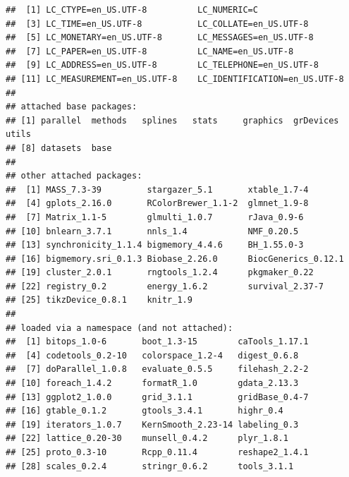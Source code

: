 \documentclass{article}\usepackage[]{graphicx}\usepackage[]{color}
\makeatletter
\newenvironment{kframe}{%
 \def\at@end@of@kframe{}%
 \ifinner\ifhmode%
  \def\at@end@of@kframe{\end{minipage}}%
  \begin{minipage}{\columnwidth}%
 \fi\fi%
 \def\FrameCommand##1{\hskip\@totalleftmargin \hskip-\fboxsep
 \colorbox{shadecolor}{##1}\hskip-\fboxsep
     \hskip-\linewidth \hskip-\@totalleftmargin \hskip\columnwidth}%
 \MakeFramed {\advance\hsize-\width
   \@totalleftmargin\z@ \linewidth\hsize
   \@setminipage}}%
 {\par\unskip\endMakeFramed%
 \at@end@of@kframe}
\newenvironment{knitrout}{}{} %
\makeatother
\begin{document}
\begin{knitrout}
\begin{kframe}
\begin{verbatim}
##  [1] LC_CTYPE=en_US.UTF-8          LC_NUMERIC=C                 
##  [3] LC_TIME=en_US.UTF-8           LC_COLLATE=en_US.UTF-8       
##  [5] LC_MONETARY=en_US.UTF-8       LC_MESSAGES=en_US.UTF-8      
##  [7] LC_PAPER=en_US.UTF-8          LC_NAME=en_US.UTF-8          
##  [9] LC_ADDRESS=en_US.UTF-8        LC_TELEPHONE=en_US.UTF-8     
## [11] LC_MEASUREMENT=en_US.UTF-8    LC_IDENTIFICATION=en_US.UTF-8
## 
## attached base packages:
## [1] parallel  methods   splines   stats     graphics  grDevices utils    
## [8] datasets  base     
## 
## other attached packages:
##  [1] MASS_7.3-39         stargazer_5.1       xtable_1.7-4       
##  [4] gplots_2.16.0       RColorBrewer_1.1-2  glmnet_1.9-8       
##  [7] Matrix_1.1-5        glmulti_1.0.7       rJava_0.9-6        
## [10] bnlearn_3.7.1       nnls_1.4            NMF_0.20.5         
## [13] synchronicity_1.1.4 bigmemory_4.4.6     BH_1.55.0-3        
## [16] bigmemory.sri_0.1.3 Biobase_2.26.0      BiocGenerics_0.12.1
## [19] cluster_2.0.1       rngtools_1.2.4      pkgmaker_0.22      
## [22] registry_0.2        energy_1.6.2        survival_2.37-7    
## [25] tikzDevice_0.8.1    knitr_1.9          
## 
## loaded via a namespace (and not attached):
##  [1] bitops_1.0-6       boot_1.3-15        caTools_1.17.1    
##  [4] codetools_0.2-10   colorspace_1.2-4   digest_0.6.8      
##  [7] doParallel_1.0.8   evaluate_0.5.5     filehash_2.2-2    
## [10] foreach_1.4.2      formatR_1.0        gdata_2.13.3      
## [13] ggplot2_1.0.0      grid_3.1.1         gridBase_0.4-7    
## [16] gtable_0.1.2       gtools_3.4.1       highr_0.4         
## [19] iterators_1.0.7    KernSmooth_2.23-14 labeling_0.3      
## [22] lattice_0.20-30    munsell_0.4.2      plyr_1.8.1        
## [25] proto_0.3-10       Rcpp_0.11.4        reshape2_1.4.1    
## [28] scales_0.2.4       stringr_0.6.2      tools_3.1.1
\end{verbatim}
\end{kframe}
\end{knitrout}
\end{document}
